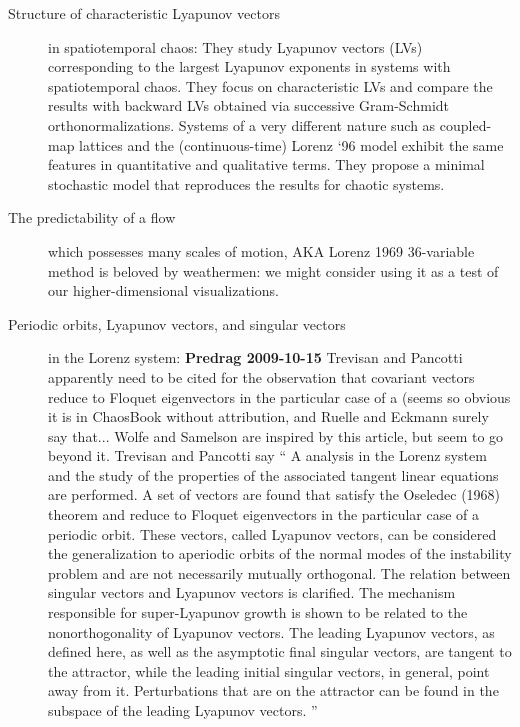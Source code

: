 \begin{description}
\item[Structure of characteristic {L}yapunov vectors]
in spatiotemporal chaos:
They study Lyapunov vectors (LVs) corresponding to
the largest Lyapunov exponents in systems with spatiotemporal
chaos. They focus on characteristic LVs and compare the results
with backward LVs obtained via successive Gram-Schmidt
orthonormalizations. Systems of a very different nature such
as coupled-map lattices and the (continuous-time) Lorenz `96
model exhibit the same features in quantitative and
qualitative terms. They propose a minimal
stochastic model that reproduces the results for chaotic
systems.

\item[The predictability of a flow] which possesses
                many scales of motion,
AKA Lorenz 1969 36-variable method is beloved by weathermen:
we might consider using it as a test of our higher-dimensional
visualizations.

\item[Periodic orbits, Lyapunov vectors, and singular
    vectors] in the Lorenz system:
{\bf Predrag 2009-10-15} Trevisan and Pancotti apparently
need to be cited for the observation that covariant vectors
reduce to Floquet eigenvectors in the particular case of a
{\po} (seems so obvious it is in ChaosBook without
attribution, and Ruelle and Eckmann surely say
that... Wolfe and Samelson are inspired by this
article, but seem to go beyond it. Trevisan and Pancotti say
``
A {\po} analysis in the Lorenz system
and the study of the properties of the associated tangent
linear equations are performed.
			\toCB
A set of vectors are found
that satisfy the Oseledec (1968) theorem and reduce to
Floquet eigenvectors in the particular case of a periodic
orbit. These vectors, called Lyapunov vectors, can be
considered the generalization to aperiodic orbits of the
normal modes of the instability problem and are not
necessarily mutually orthogonal. The relation between
singular vectors and Lyapunov vectors is clarified. The
mechanism responsible for super-Lyapunov growth is shown to
be related to the nonorthogonality of Lyapunov vectors. The
leading Lyapunov vectors, as defined here, as well as the
asymptotic final singular vectors, are tangent to the
attractor, while the leading initial singular vectors, in
general, point away from it. Perturbations that are on the
attractor can be found in the subspace of the leading
Lyapunov vectors.
    ''


\end{description}
